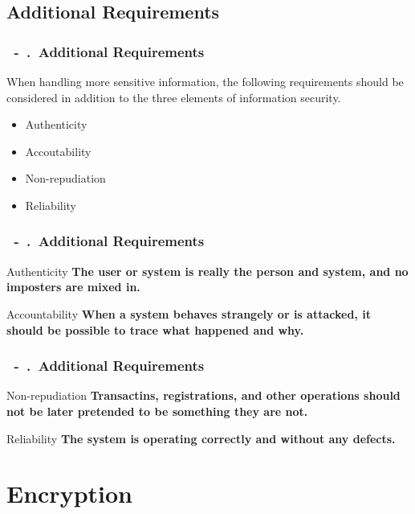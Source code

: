 \documentclass{beamer}
\newcommand{\shownum}{\thesection\ -\ \thesubsection.\ }
\begin{document}
\subsection{Additional Requirements}
\newcommand{\additionalrequirements}{\shownum Additional Requirements}
\begin{frame}
    \frametitle{\additionalrequirements}
    When handling more sensitive information, the following requirements should be considered in addition to the three elements of information security.
    \begin{block}{}
        \begin{itemize}
            \item Authenticity
            \item Accoutability
            \item Non-repudiation
            \item Reliability
        \end{itemize}
    \end{block}
\end{frame}
\begin{frame}
    \frametitle{\additionalrequirements}
    \begin{exampleblock}{Authenticity}
        \textbf{The user or system is really the person and system, and no imposters are mixed in.}
    \end{exampleblock}
    \begin{exampleblock}{Accountability}
        \textbf{When a system behaves strangely or is attacked, it should be possible to trace what happened and why.}
    \end{exampleblock}
\end{frame}
\begin{frame}
    \frametitle{\additionalrequirements}
    \begin{exampleblock}{Non-repudiation}
        \textbf{Transactins, registrations, and other operations should not be later pretended to be something they are not.}
    \end{exampleblock}
    \begin{exampleblock}{Reliability}
        \textbf{The system is operating correctly and without any defects.}
    \end{exampleblock}
\end{frame}
\section{Encryption}
\begin{frame}
    \tableofcontents[currentsection,sectionstyle=show/shaded,subsectionstyle=shaded/shaded]
\end{frame}
\end{document}
